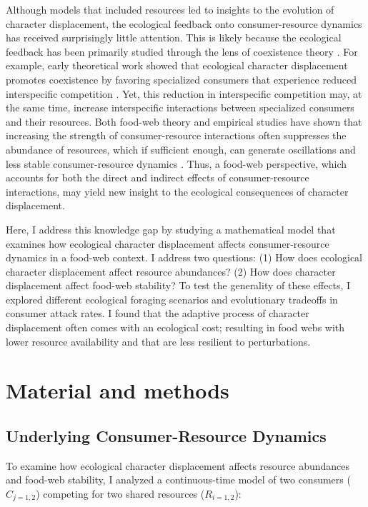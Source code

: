 \documentclass[11pt,]{article}
\begin{document}
Although models that included resources led to insights to the evolution
of character displacement, the ecological feedback onto
consumer-resource dynamics has received surprisingly little attention.
This is likely because the ecological feedback has been primarily
studied through the lens of coexistence theory
\citep{Lawlor1976, Germain2018, Bassar2017, McPeek2019}. For example,
early theoretical work showed that ecological character displacement
promotes coexistence by favoring specialized consumers that experience
reduced interspecific competition \citep{Lawlor1976}. Yet, this
reduction in interspecific competition may, at the same time, increase
interspecific interactions between specialized consumers and their
resources. Both food-web theory and empirical studies have shown that
increasing the strength of consumer-resource interactions often
suppresses the abundance of resources, which if sufficient enough, can
generate oscillations and less stable consumer-resource dynamics
\citep{Rosenzweig1971, Luckinbill1973, Murdoch2002, Murdoch2003, McCann2011}.
Thus, a food-web perspective, which accounts for both the direct and
indirect effects of consumer-resource interactions, may yield new
insight to the ecological consequences of character displacement.

Here, I address this knowledge gap by studying a mathematical model that
examines how ecological character displacement affects consumer-resource
dynamics in a food-web context. I address two questions: (1) How does
ecological character displacement affect resource abundances? (2) How
does character displacement affect food-web stability? To test the
generality of these effects, I explored different ecological foraging
scenarios and evolutionary tradeoffs in consumer attack rates. I found
that the adaptive process of character displacement often comes with an
ecological cost; resulting in food webs with lower resource availability
and that are less resilient to perturbations.

\section{Material and methods}\label{material-and-methods}

\subsection{Underlying Consumer-Resource
Dynamics}\label{underlying-consumer-resource-dynamics}

To examine how ecological character displacement affects resource
abundances and food-web stability, I analyzed a continuous-time model of
two consumers (\(C_{j=1,2}\)) competing for two shared resources
(\(R_{i=1,2}\)):
\end{document}
